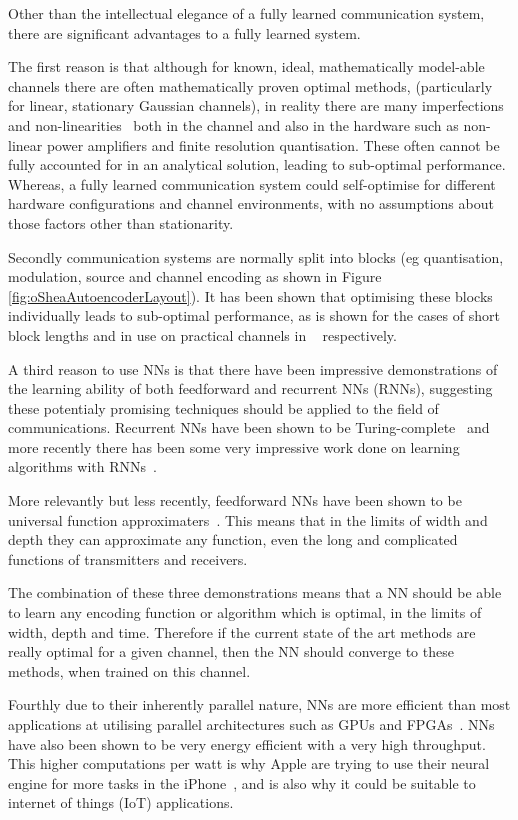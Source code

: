 \documentclass[12pt,onecolumn,letterpaper]{article}
\begin{document}
Other than the intellectual elegance of a fully learned communication system, there are significant advantages to a fully learned system. 

The first reason is that although for known, ideal, mathematically model-able channels there are often mathematically proven optimal methods, (particularly for linear, stationary Gaussian channels), in reality there are many imperfections and non-linearities~\cite{NonLinearities} both in the channel and also in the hardware such as non-linear power amplifiers and finite resolution quantisation. These often cannot be fully accounted for in an analytical solution, leading to sub-optimal performance. Whereas, a fully learned communication system could self-optimise for different hardware configurations and channel environments, with no assumptions about those factors other than stationarity.

Secondly communication systems are normally split into blocks (eg quantisation, modulation, source and channel encoding as shown in Figure \ref{fig:oSheaAutoencoderLayout}). It has been shown that optimising these blocks individually leads to sub-optimal performance, as is shown for the cases of short block lengths and in use on practical channels in ~\cite{ChannelEncodingOptimality, NonOptimalRayleigh} respectively.

A third reason to use NNs is that there have been impressive demonstrations of the learning ability of both feedforward and recurrent NNs (RNNs), suggesting these potentialy promising techniques should be applied to the field of communications. Recurrent NNs have been shown to be Turing-complete~\cite{RnnTuringComplete} and more recently there has been some very impressive work done on learning algorithms with RNNs~\cite{NeuralProgramInterpreters}. 

More relevantly but less recently, feedforward NNs have been shown to be universal function approximaters~\cite{NnUniversalApproximators}. This means that in the limits of width and depth they can approximate any function, even the long and complicated functions of transmitters and receivers.

The combination of these three demonstrations means that a NN should be able to learn any encoding function or algorithm which is optimal, in the limits of width, depth and time. Therefore if the current state of the art methods are really optimal for a given channel, then the NN should converge to these methods, when trained on this channel.

Fourthly due to their inherently parallel nature, NNs are more efficient than most applications at utilising parallel architectures such as GPUs and FPGAs~\cite{FpgaGpuBetterUtilisation}. NNs have also been shown to be very energy efficient with a very high throughput. This higher computations per watt is why Apple are trying to use their neural engine for more tasks in the iPhone~\cite{WiredAppleNeuralEngine}, and is also why it could be suitable to internet of things (IoT) applications.
\end{document}
